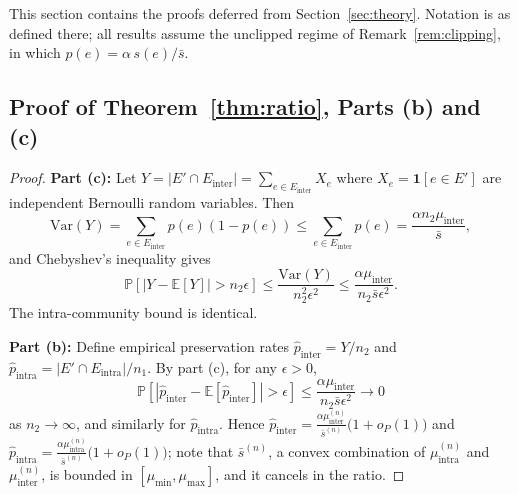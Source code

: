\documentclass[10pt,journal,compsoc]{IEEEtran}
\begin{document}
This section contains the proofs deferred from Section~\ref{sec:theory}. Notation is as defined there; all results assume the unclipped regime of Remark~\ref{rem:clipping}, in which $p(e) = \alpha\, s(e)/\bar{s}$.

\subsection*{Proof of Theorem~\ref{thm:ratio}, Parts (b) and (c)}

\begin{proof}
\textbf{Part (c):} Let $Y = |E' \cap E_{\text{inter}}| = \sum_{e \in E_{\text{inter}}} X_e$ where $X_e = \mathbf{1}[e \in E']$ are independent Bernoulli random variables.
Then
\begin{equation}
\text{Var}(Y) = \sum_{e \in E_{\text{inter}}} p(e)(1 - p(e)) \leq \sum_{e \in E_{\text{inter}}} p(e) = \frac{\alpha n_2 \mu_{\text{inter}}}{\bar{s}},
\end{equation}
and Chebyshev's inequality gives
\begin{equation}
\mathbb{P}[|Y - \mathbb{E}[Y]| > n_2 \epsilon] \leq \frac{\text{Var}(Y)}{n_2^2 \epsilon^2} \leq \frac{\alpha \mu_{\text{inter}}}{n_2 \bar{s} \epsilon^2}.
\end{equation}
The intra-community bound is identical.

\textbf{Part (b):} Define empirical preservation rates $\hat{p}_{\text{inter}} = Y/n_2$ and $\hat{p}_{\text{intra}} = |E' \cap E_{\text{intra}}|/n_1$.
By part (c), for any $\epsilon > 0$,
\begin{equation}
\mathbb{P}\left[|\hat{p}_{\text{inter}} - \mathbb{E}[\hat{p}_{\text{inter}}]| > \epsilon\right] \leq \frac{\alpha \mu_{\text{inter}}}{n_2 \bar{s} \epsilon^2} \to 0
\end{equation}
as $n_2 \to \infty$, and similarly for $\hat{p}_{\text{intra}}$.
Hence $\hat{p}_{\text{inter}} = \frac{\alpha \mu_{\text{inter}}^{(n)}}{\bar{s}^{(n)}}\bigl(1 + o_P(1)\bigr)$ and $\hat{p}_{\text{intra}} = \frac{\alpha \mu_{\text{intra}}^{(n)}}{\bar{s}^{(n)}}\bigl(1 + o_P(1)\bigr)$; note that $\bar{s}^{(n)}$, a convex combination of $\mu_{\text{intra}}^{(n)}$ and $\mu_{\text{inter}}^{(n)}$, is bounded in $[\mu_{\min}, \mu_{\max}]$, and it cancels in the ratio.


\end{proof}
\end{document}
